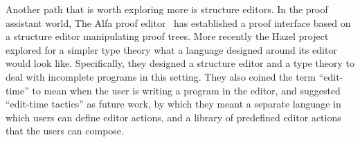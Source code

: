 Another path that is worth exploring more is structure editors. In the proof
assistant world, The Alfa proof editor~\cite{alfa} has established a proof
interface based on a structure editor manipulating proof trees. More recently
the Hazel project~\cite{hazelnut,hazelEditor} explored for a simpler type
theory what a language designed around its editor would look like.
Specifically, they designed a structure editor and a type theory to deal with
incomplete programs in this setting. They also coined the term ``edit-time'' to
mean when the user is writing a program in the editor, and suggested
``edit-time tactics'' as future work, by which they
meant a separate language in which users can define editor actions, and a
library of predefined editor actions that the users can compose.
